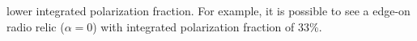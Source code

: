 lower integrated polarization fraction. 
For example, it is possible to see a edge-on radio relic ($\alpha = 0$) with integrated polarization fraction of 33\%. 
\par 

